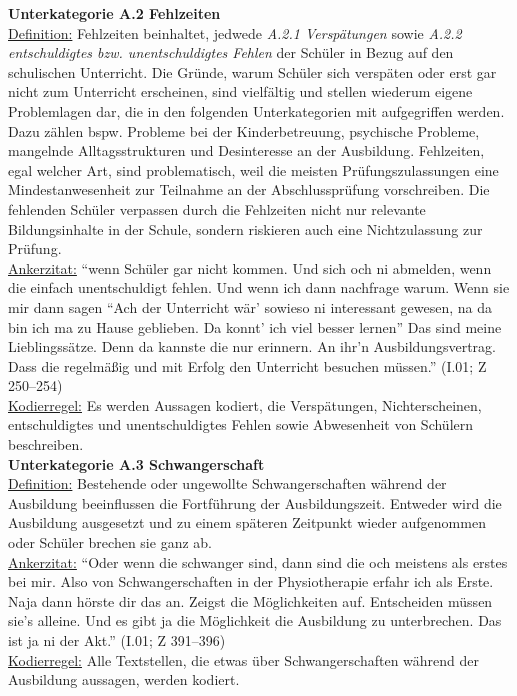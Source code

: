 \textbf{Unterkategorie A.2 Fehlzeiten}\\
\underline{Definition:} Fehlzeiten beinhaltet, jedwede \textit{A.2.1 Verspätungen} sowie \textit{A.2.2 entschuldigtes bzw. unentschuldigtes Fehlen} der Schüler in Bezug auf den schulischen Unterricht. Die Gründe, warum Schüler sich verspäten oder erst gar nicht zum Unterricht erscheinen, sind vielfältig und stellen wiederum eigene Problemlagen dar, die in den folgenden Unterkategorien mit aufgegriffen werden. Dazu zählen bspw. Probleme bei der Kinderbetreuung, psychische Probleme, mangelnde Alltagsstrukturen und Desinteresse an der Ausbildung. Fehlzeiten, egal welcher Art, sind problematisch, weil die meisten Prüfungszulassungen eine Mindestanwesenheit zur Teilnahme an der Abschlussprüfung vorschreiben. Die fehlenden Schüler verpassen durch die Fehlzeiten nicht nur relevante Bildungsinhalte in der Schule, sondern riskieren auch eine Nichtzulassung zur Prüfung.\\
\underline{Ankerzitat:} "`wenn Schüler gar nicht kommen. Und sich och ni abmelden, wenn die einfach unentschuldigt fehlen. Und wenn ich dann nachfrage warum. Wenn sie mir dann sagen "`Ach der Unterricht wär' sowieso ni interessant gewesen, na da bin ich ma zu Hause geblieben. Da konnt' ich viel besser lernen"' Das sind meine Lieblingssätze. Denn da kannste die nur erinnern. An ihr'n Ausbildungsvertrag. Dass die regelmäßig und mit Erfolg den Unterricht besuchen müssen."' (I.01; Z 250--254)\\
\underline{Kodierregel:} Es werden Aussagen kodiert, die Verspätungen, Nichterscheinen, entschuldigtes und unentschuldigtes Fehlen sowie Abwesenheit von Schülern beschreiben.\\

\textbf{Unterkategorie A.3 Schwangerschaft}\\
\underline{Definition:} Bestehende oder ungewollte Schwangerschaften während der Ausbildung beeinflussen die Fortführung der Ausbildungszeit. Entweder wird die Ausbildung ausgesetzt und zu einem späteren Zeitpunkt wieder aufgenommen oder Schüler brechen sie ganz ab.\\
\underline{Ankerzitat:} "`Oder wenn die schwanger sind, dann sind die och meistens als erstes bei mir. Also von Schwangerschaften in der Physiotherapie erfahr ich als Erste. Naja dann hörste dir das an. Zeigst die Möglichkeiten auf. Entscheiden müssen sie's alleine. Und es gibt ja die Möglichkeit die Ausbildung zu unterbrechen. Das ist ja ni der Akt."' (I.01; Z 391--396)\\
\underline{Kodierregel:} Alle Textstellen, die etwas über Schwangerschaften während der Ausbildung aussagen, werden kodiert.\\

